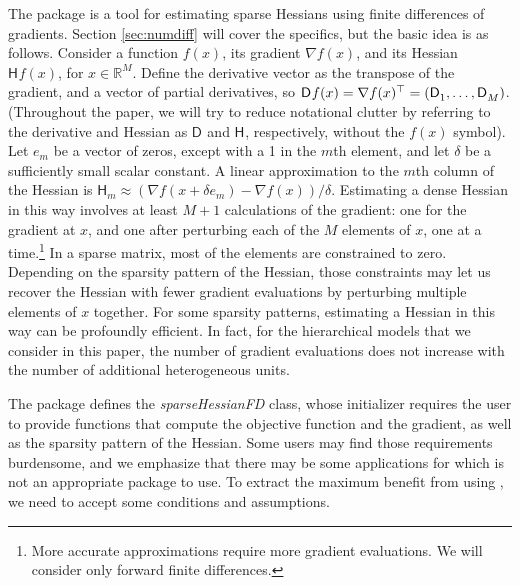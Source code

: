 \documentclass[article]{jss}\usepackage[]{graphicx}\usepackage[]{color}
\newcommand{\class}[1]{\textsl{#1}}
\newcommand{\parD}[3]{\mathsf{D}^{#1}_{#2}#3}
\newcommand{\hess}[2]{\mathsf{H}_{#1}#2}
\begin{document}
The  package is a tool for estimating
sparse Hessians using finite differences of gradients.  Section \ref{sec:numdiff} will
cover the specifics, but the basic idea is as follows.  Consider a
function $f(x)$, its gradient $\nabla{f(x)}$, and its Hessian
$\hess{}{f(x)}$, for $x\in\mathbb{R}^M$.  Define the derivative vector
as the transpose of the gradient, and a vector of partial derivatives, so
${\parD{}{}{f(x)}=\nabla f(x)^\top=\left(\parD{}{1}{},\mathellipsis,\parD{}{M}{}\right)}$.   (Throughout the paper, we will try
to reduce notational clutter by referring to the derivative and
Hessian as $\parD{}{}{}$ and $\hess{}{}$, respectively, without the
$f(x)$ symbol).  Let $e_m$ be a vector of zeros, except with a 1 in the $m$th
element, and let $\delta$ be a sufficiently small scalar
constant. A linear approximation to the $m$th column of the Hessian is ${\hess{m}{}\approx\left(\nabla f(x+\delta
  e_m)- \nabla f(x)\right)/\delta}$.  Estimating a dense Hessian in this way involves at least $M+1$ calculations of the
gradient: one for the gradient at $x$, and one after perturbing each
of the $M$ elements of $x$, one at a time.\footnote{More accurate
  approximations require more gradient evaluations.  We will consider
  only forward finite differences.}  In a sparse matrix, most of the
elements are constrained to zero.  Depending
on the sparsity pattern of the Hessian, those constraints may let us recover
the Hessian with fewer gradient evaluations by perturbing multiple
elements of $x$ together.  For some sparsity patterns, estimating a Hessian in
this way can be profoundly efficient.  In fact, for the hierarchical models that we consider in
this paper, the number of gradient evaluations does not increase with
the number of additional heterogeneous units.

The package defines the \class{sparseHessianFD} class, whose initializer
requires the user to provide functions that compute the objective
function and the gradient, as well as the sparsity pattern of the
Hessian.  Some users may find those requirements burdensome, and we
emphasize that there may be some applications for
which  is not an appropriate package to use. To
extract the maximum benefit from using , we need
to accept some conditions and assumptions.
\end{document}
